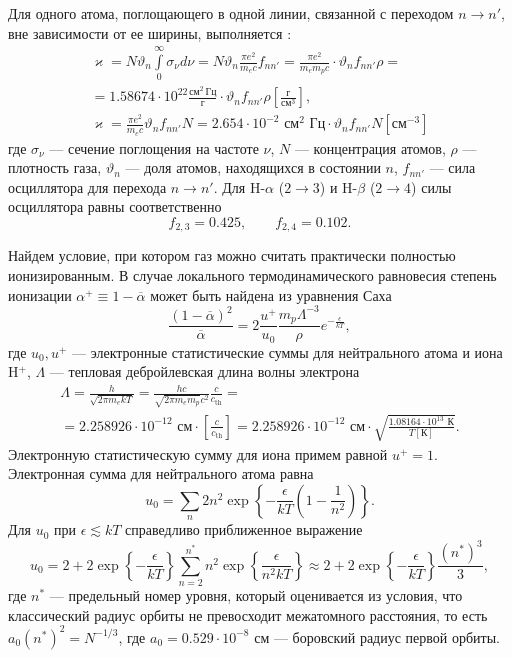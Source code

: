 Для одного атома, поглощающего в одной линии, связанной с переходом $n \to n'$, вне зависимости от ее ширины, выполняется \cite{zeldovich2008}:
\[\begin{gathered}
\varkappa = N\vartheta_n\int\limits_0^\infty \sigma_\nu d\nu = N \vartheta_n\frac{\pi e^2}{m_ec} f_{nn'}= 
 \frac{\pi e^2}{m_e m_p c} \cdot  \vartheta_n f_{nn'}\rho =  \\ =
1.58674 \cdot 10^{22}\frac{\text{см}^2\, \text{Гц}}{\text{г}} \cdot \vartheta_n f_{nn'}\rho \left[\frac{\text{г}}{\text{см}^3}\right]
,\\
\varkappa = \frac{\pi e^2}{m_ec} \vartheta_n f_{nn'} N = 2.654 \cdot 10^{-2} \text{ см}^2 \text{ Гц}
\cdot \vartheta_n f_{nn'} N[\text{см}^{-3}]
\end{gathered}\]
где $\sigma_\nu$ --- сечение поглощения на частоте $\nu$, $N$ --- концентрация атомов, $\rho$ --- плотность газа, $\vartheta_n$ --- доля атомов, находящихся в состоянии $n$, $f_{nn'}$ --- сила осциллятора для перехода $n \to n'$. Для H-$\alpha$ ($2 \to 3$) и H-$\beta$ ($2 \to 4$) силы осциллятора равны соответственно
\[
f_{2,3} = 0.425, \qquad f_{2,4} = 0.102.
\]

Найдем условие, при котором газ можно считать практически полностью ионизированным. В случае локального термодинамического равновесия степень ионизации $\alpha^+ \equiv 1 - \overline{\alpha}$ может быть найдена из уравнения Саха \cite{saha1921}
\[
\frac{(1-\overline{\alpha})^2}{\overline{\alpha}} = 2\frac{u^+}{u_0} \frac{m_p\Lambda^{-3}}{\rho} 
e^{-\frac{\epsilon}{kT}},
\]
где $u_0, u^+$ --- электронные статистические суммы для нейтрального атома и иона H${}^+$, $\Lambda$ --- тепловая дебройлевская длина волны электрона
\begin{multline*}
\Lambda = \frac{h}{\sqrt{2\pi m_e kT}} = \frac{hc}{\sqrt{2\pi m_e m_p}c^2} \frac{c}{c_\text{th}} = \\
= 2.258926 \cdot 10^{-12} \text{ см} \cdot \left[\frac{c}{c_\text{th}}\right]
= 2.258926 \cdot 10^{-12} \text{ см} \cdot \sqrt{\frac{1.08164 \cdot 10^{13} \text{ К}}{T [\text{К}]}}
 .
\end{multline*}
Электронную статистическую сумму для иона примем равной $u^+ = 1$. Электронная сумма для нейтрального атома равна
\[
u_0 = \sum_n 2n^2 \exp\left\{-\frac{\epsilon}{kT}\left(1 - \frac{1}{n^2}\right)\right\}.
\]
Для $u_0$ при $\epsilon \lesssim kT$ справедливо приближенное выражение 
\[
u_0 = 2 + 2\exp\left\{-\frac{\epsilon}{kT}\right\}\sum_{n = 2}^{n^*} n^2\exp\left\{\frac{\epsilon}{n^2kT}\right\} \approx
2 + 2 \exp\left\{-\frac{\epsilon}{kT}\right\} \frac{(n^*)^3}{3},
\]
где $n^*$ --- предельный номер уровня, который оценивается из условия, что классический радиус орбиты не превосходит межатомного расстояния, то есть $a_0 (n^*)^2 = N^{-1/3}$, где $a_0 = 0.529 \cdot 10^{-8} \text{ см}$ --- боровский радиус первой орбиты.

